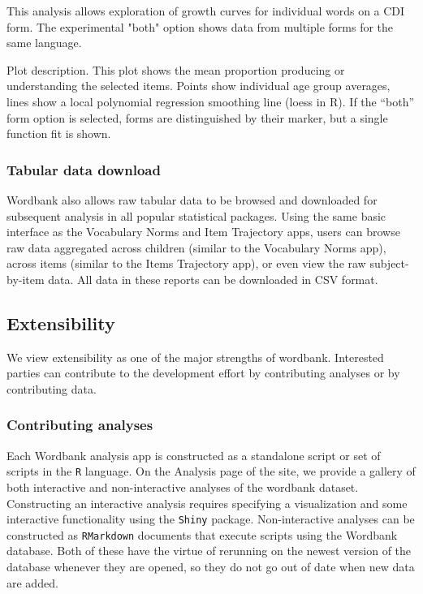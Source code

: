 \documentclass[man,noapacite]{apa2}
\begin{document}
This analysis allows exploration of growth curves for individual words on a CDI form. The experimental "both" option shows data from multiple forms for the same language.

Plot description. This plot shows the mean proportion producing or understanding the selected items. Points show individual age group averages, lines show a local polynomial regression smoothing line (loess in R). If the “both” form option is selected, forms are distinguished by their marker, but a single function fit is shown.

\subsubsection{Tabular data download}

Wordbank also allows raw tabular data to be browsed and downloaded for subsequent analysis in all popular statistical packages. Using the same basic interface as the Vocabulary Norms and Item Trajectory apps, users can browse raw data aggregated across children (similar to the Vocabulary Norms app), across items (similar to the Items Trajectory app), or even view the raw subject-by-item data. All data in these reports can be downloaded in CSV format. 

\subsection{Extensibility}

We view extensibility as one of the major strengths of wordbank. Interested parties can contribute to the development effort by contributing analyses or by contributing data. 

\subsubsection{Contributing analyses}

Each Wordbank analysis app is constructed as a standalone script or set of scripts in the \texttt{R} language. On the Analysis page of the site, we provide a gallery of both interactive and non-interactive analyses of the wordbank dataset. Constructing an interactive analysis requires specifying a visualization and some interactive functionality using the \texttt{Shiny} package. Non-interactive analyses can be constructed as \texttt{RMarkdown} documents that execute scripts using the Wordbank database. Both of these have the virtue of rerunning on the newest version of the database whenever they are opened, so they do not go out of date when new data are added. 
\end{document}
